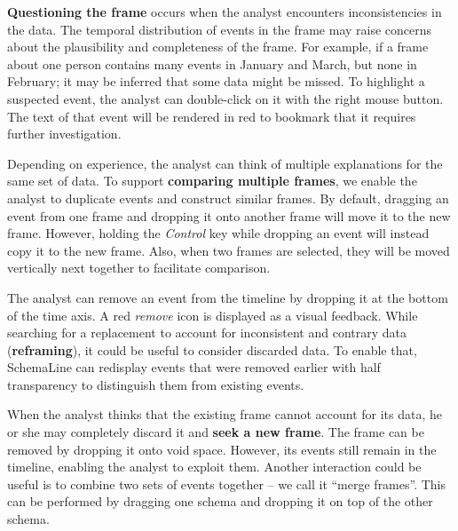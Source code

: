 \textbf{Questioning the frame} occurs when the analyst encounters inconsistencies in the data. The temporal distribution of events in the frame may raise concerns about the plausibility and completeness of the frame. For example, if a frame about one person contains many events in January and March, but none in February; it may be inferred that some data might be missed. To highlight a suspected event, the analyst can double-click on it with the right mouse button. The text of that event will be rendered in red to bookmark that it requires further investigation.

Depending on experience, the analyst can think of multiple explanations for the same set of data. To support \textbf{comparing multiple frames}, we enable the analyst to duplicate events and construct similar frames. By default, dragging an event from one frame and dropping it onto another frame will move it to the new frame. However, holding the \emph{Control} key while dropping an event will instead copy it to the new frame. Also, when two frames are selected, they will be moved vertically next together to facilitate comparison.

The analyst can remove an event from the timeline by dropping it at the bottom of the time axis. A red \emph{remove} icon is displayed as a visual feedback. While searching for a replacement to account for inconsistent and contrary data (\textbf{reframing}), it could be useful to consider discarded data. To enable that, SchemaLine can redisplay events that were removed earlier with half transparency to distinguish them from existing events.

When the analyst thinks that the existing frame cannot account for its data, he or she may  completely discard it and \textbf{seek a new frame}. The frame can be removed by dropping it onto void space. However, its events still remain in the timeline, enabling the analyst to exploit them. Another interaction could be useful is to combine two sets of events together -- we call it ``merge frames''. This can be performed by dragging one schema and dropping it on top of the other schema.